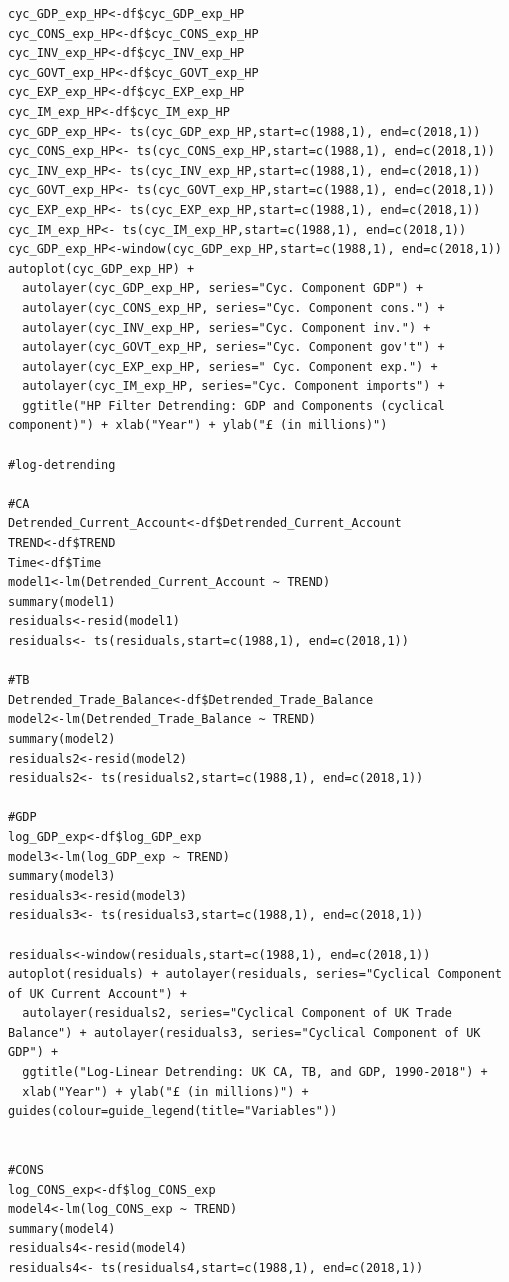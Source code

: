 \documentclass[12pt]{article}
\begin{document}
\begin{verbatim}
cyc_GDP_exp_HP<-df$cyc_GDP_exp_HP
cyc_CONS_exp_HP<-df$cyc_CONS_exp_HP
cyc_INV_exp_HP<-df$cyc_INV_exp_HP
cyc_GOVT_exp_HP<-df$cyc_GOVT_exp_HP
cyc_EXP_exp_HP<-df$cyc_EXP_exp_HP
cyc_IM_exp_HP<-df$cyc_IM_exp_HP
cyc_GDP_exp_HP<- ts(cyc_GDP_exp_HP,start=c(1988,1), end=c(2018,1))
cyc_CONS_exp_HP<- ts(cyc_CONS_exp_HP,start=c(1988,1), end=c(2018,1))
cyc_INV_exp_HP<- ts(cyc_INV_exp_HP,start=c(1988,1), end=c(2018,1))
cyc_GOVT_exp_HP<- ts(cyc_GOVT_exp_HP,start=c(1988,1), end=c(2018,1))
cyc_EXP_exp_HP<- ts(cyc_EXP_exp_HP,start=c(1988,1), end=c(2018,1))
cyc_IM_exp_HP<- ts(cyc_IM_exp_HP,start=c(1988,1), end=c(2018,1))
cyc_GDP_exp_HP<-window(cyc_GDP_exp_HP,start=c(1988,1), end=c(2018,1)) 
autoplot(cyc_GDP_exp_HP) +
  autolayer(cyc_GDP_exp_HP, series="Cyc. Component GDP") +
  autolayer(cyc_CONS_exp_HP, series="Cyc. Component cons.") +
  autolayer(cyc_INV_exp_HP, series="Cyc. Component inv.") +
  autolayer(cyc_GOVT_exp_HP, series="Cyc. Component gov't") +
  autolayer(cyc_EXP_exp_HP, series=" Cyc. Component exp.") +
  autolayer(cyc_IM_exp_HP, series="Cyc. Component imports") +
  ggtitle("HP Filter Detrending: GDP and Components (cyclical component)") + xlab("Year") + ylab("£ (in millions)")

#log-detrending

#CA
Detrended_Current_Account<-df$Detrended_Current_Account
TREND<-df$TREND
Time<-df$Time
model1<-lm(Detrended_Current_Account ~ TREND)
summary(model1)
residuals<-resid(model1)
residuals<- ts(residuals,start=c(1988,1), end=c(2018,1))

#TB
Detrended_Trade_Balance<-df$Detrended_Trade_Balance
model2<-lm(Detrended_Trade_Balance ~ TREND)
summary(model2)
residuals2<-resid(model2)
residuals2<- ts(residuals2,start=c(1988,1), end=c(2018,1))

#GDP
log_GDP_exp<-df$log_GDP_exp
model3<-lm(log_GDP_exp ~ TREND)
summary(model3)
residuals3<-resid(model3)
residuals3<- ts(residuals3,start=c(1988,1), end=c(2018,1))

residuals<-window(residuals,start=c(1988,1), end=c(2018,1)) 
autoplot(residuals) + autolayer(residuals, series="Cyclical Component of UK Current Account") +
  autolayer(residuals2, series="Cyclical Component of UK Trade Balance") + autolayer(residuals3, series="Cyclical Component of UK GDP") +
  ggtitle("Log-Linear Detrending: UK CA, TB, and GDP, 1990-2018") + 
  xlab("Year") + ylab("£ (in millions)") + guides(colour=guide_legend(title="Variables"))


#CONS
log_CONS_exp<-df$log_CONS_exp
model4<-lm(log_CONS_exp ~ TREND)
summary(model4)
residuals4<-resid(model4)
residuals4<- ts(residuals4,start=c(1988,1), end=c(2018,1))


\end{verbatim}
\end{document}
